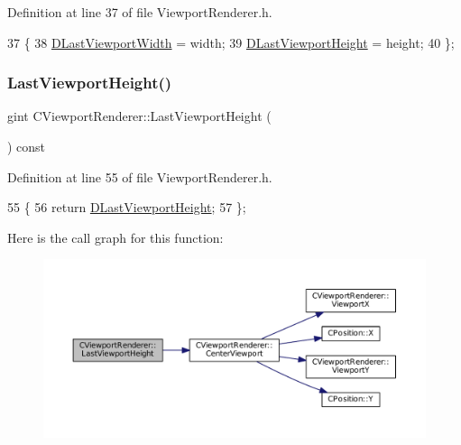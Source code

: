 Definition at line 37 of file Viewport\+Renderer.\+h.


\begin{DoxyCode}
37                                                           \{
38             \hyperlink{classCViewportRenderer_aaa21acd1b43badc3c1a3b0bf9b0f86f9}{DLastViewportWidth} = width;
39             \hyperlink{classCViewportRenderer_aaca5c330615fc2aacc57dede8e7c18b0}{DLastViewportHeight} = height;
40         \};
\end{DoxyCode}
\hypertarget{classCViewportRenderer_a55bdef4acd6335ac15f5017ad82111b3}{}\label{classCViewportRenderer_a55bdef4acd6335ac15f5017ad82111b3} 
\subsubsection{\texorpdfstring{Last\+Viewport\+Height()}{LastViewportHeight()}}
{\footnotesize\ttfamily gint C\+Viewport\+Renderer\+::\+Last\+Viewport\+Height (\begin{DoxyParamCaption}{ }\end{DoxyParamCaption}) const\hspace{0.3cm}{\ttfamily [inline]}}



Definition at line 55 of file Viewport\+Renderer.\+h.


\begin{DoxyCode}
55                                        \{
56             \textcolor{keywordflow}{return} \hyperlink{classCViewportRenderer_aaca5c330615fc2aacc57dede8e7c18b0}{DLastViewportHeight};
57         \};
\end{DoxyCode}
Here is the call graph for this function\+:\nopagebreak
\begin{figure}[H]
\begin{center}
\leavevmode
\includegraphics[width=350pt]{classCViewportRenderer_a55bdef4acd6335ac15f5017ad82111b3_cgraph}
\end{center}
\end{figure}
\hypertarget{classCViewportRenderer_a4d87305e8c2da6933d13c9a98d80bb21}{}\label{classCViewportRenderer_a4d87305e8c2da6933d13c9a98d80bb21} 
